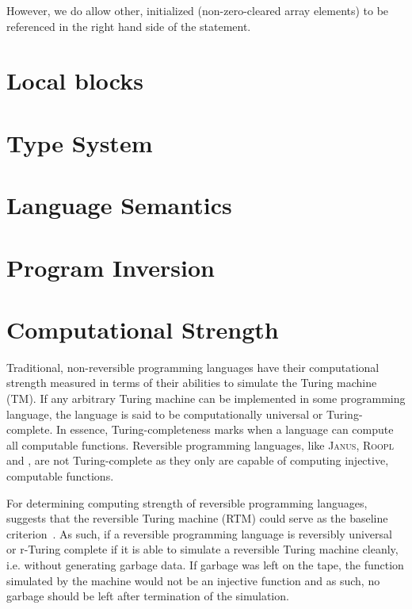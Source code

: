 However, we do allow other, initialized (non-zero-cleared array elements) to be referenced in the right hand side of the statement.

\section{Local blocks}
\label{sec:local-blocks}


\section{Type System}
\label{sec:type-system}

\section{Language Semantics}
\label{sec:language-semantics}

\section{Program Inversion}
\label{sec:program-inversion}




\section{Computational Strength}
\label{sec:computational-strength}
Traditional, non-reversible programming languages have their computational strength measured in terms of their abilities to simulate the Turing machine (TM). If any arbitrary Turing machine can be implemented in some programming language, the language is said to be computationally universal or Turing-complete. In essence, Turing-completeness marks when a language can compute all computable functions. Reversible programming languages, like \textsc{Janus}, \textsc{Roopl} and \rooplpp, are not Turing-complete as they only are capable of computing injective, computable functions.

For determining computing strength of reversible programming languages,~\citeauthor{ty:ejanus} suggests that the reversible Turing machine (RTM) could serve as the baseline criterion~\cite{ty:ejanus}. As such, if a reversible programming language is reversibly universal or r-Turing complete if it is able to simulate a reversible Turing machine cleanly, i.e. without generating garbage data. If garbage was left on the tape, the function simulated by the machine would not be an injective function and as such, no garbage should be left after termination of the simulation.

